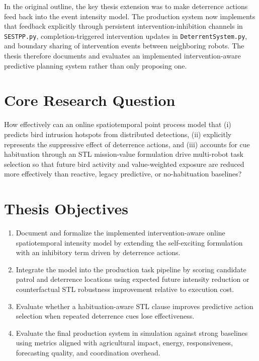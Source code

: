 In the original outline, the key thesis extension was to make deterrence actions feed back into the event intensity model. The production system now implements that feedback explicitly through persistent intervention-inhibition channels in \texttt{SESTPP.py}, completion-triggered intervention updates in \texttt{DeterrentSystem.py}, and boundary sharing of intervention events between neighboring robots. The thesis therefore documents and evaluates an implemented intervention-aware predictive planning system rather than only proposing one.

\section{Core Research Question}

How effectively can an online spatiotemporal point process model that (i) predicts bird intrusion hotspots from distributed detections, (ii) explicitly represents the suppressive effect of deterrence actions, and (iii) accounts for cue habituation through an STL mission-value formulation drive multi-robot task selection so that future bird activity and value-weighted exposure are reduced more effectively than reactive, legacy predictive, or no-habituation baselines?

\section{Thesis Objectives}

\begin{enumerate}
\item Document and formalize the implemented intervention-aware online spatiotemporal intensity model by extending the self-exciting formulation with an inhibitory term driven by deterrence actions.
\item Integrate the model into the production task pipeline by scoring candidate patrol and deterrence locations using expected future intensity reduction or counterfactual STL robustness improvement relative to execution cost.
\item Evaluate whether a habituation-aware STL clause improves predictive action selection when repeated deterrence cues lose effectiveness.
\item Evaluate the final production system in simulation against strong baselines using metrics aligned with agricultural impact, energy, responsiveness, forecasting quality, and coordination overhead.
\end{enumerate}

